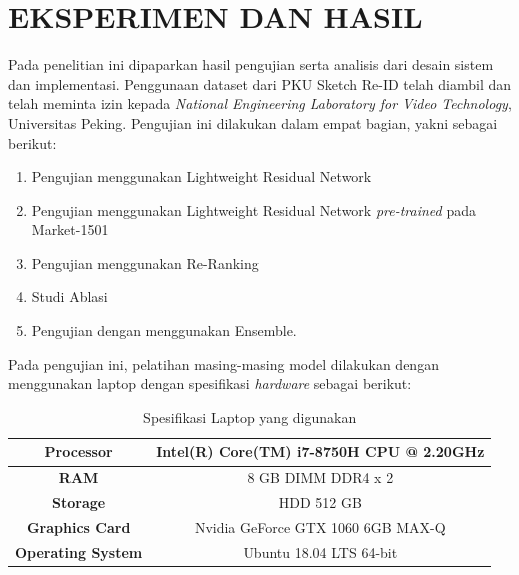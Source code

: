 \chapter{EKSPERIMEN DAN HASIL}
\label{chap:pengujiananalisis}


Pada penelitian ini dipaparkan hasil pengujian serta analisis dari desain sistem dan implementasi. Penggunaan dataset dari PKU Sketch Re-ID telah diambil dan telah meminta izin kepada \textit{National Engineering Laboratory for Video Technology}, Universitas Peking.
Pengujian ini dilakukan dalam empat bagian, yakni sebagai berikut:

\begin{enumerate}[nolistsep]
	\item Pengujian menggunakan Lightweight Residual Network
	\item Pengujian menggunakan Lightweight Residual Network \textit{pre-trained} pada Market-1501
	\item Pengujian menggunakan Re-Ranking
	\item Studi Ablasi
	\item Pengujian dengan menggunakan Ensemble.
	
	\vspace{1ex}
\end{enumerate}

Pada pengujian ini, pelatihan masing-masing model dilakukan dengan menggunakan laptop dengan spesifikasi \textit{hardware} sebagai berikut:

\begin{table}[h!]
	\begin{center}
		\begin{tabular}{|c|c|}
			\hline
			\textbf{Processor} & Intel(R) Core(TM) i7-8750H CPU @ 2.20GHz \\ \hline
			\textbf{RAM} & 8 GB DIMM DDR4 x 2\\ \hline
			\textbf{Storage} & HDD 512 GB \\ \hline
			\textbf{Graphics Card} & Nvidia GeForce GTX 1060 6GB MAX-Q \\ \hline
			\textbf{Operating System} & Ubuntu 18.04 LTS 64-bit \\ \hline
		\end{tabular}
	\end{center}
	\vspace{1ex}
	\caption{Spesifikasi Laptop yang digunakan}
	\label{tabel:3}
\end{table}


